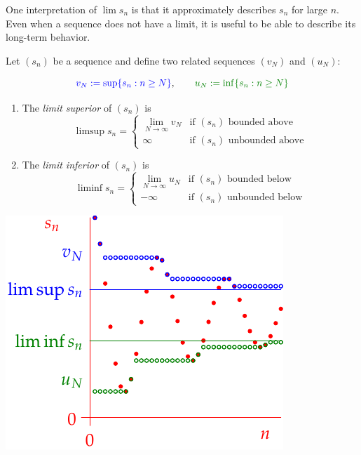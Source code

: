 \vspace{-8pt}


\goodbreak




One interpretation of $\lim s_n$ is that it approximately describes $s_n$ for large $n$. Even when a sequence does not have a limit, it is useful to be able to describe its long-term behavior.

\begin{defn}{}{}
	Let $(s_n)$ be a sequence and define two related sequences $(v_N)$ and $(u_N)$:\par
	\begin{minipage}[t]{0.6\linewidth}\vspace{-14pt}
		\[
			\textcolor{blue}{v_N:=\sup\{s_n:n\ge N\}},\qquad \textcolor{Green}{u_N:=\inf\{s_n:n\ge N\}}
		\]
		\begin{enumerate}\itemsep0pt
		  \item The \emph{limit superior} of $(s_n)$ is
		  \[
		  	\limsup s_n=
		  	\begin{cases}
		  		\lim\limits_{N\to\infty}\!v_N\!\!&\text{if $(s_n)$ bounded above}\\
		  		\infty&\text{if $(s_n)$ unbounded above}
		  	\end{cases}
		  \]
		  \item The \emph{limit inferior} of $(s_n)$ is
		  \[
		  	\liminf s_n=
		  	\begin{cases}
		  		\lim\limits_{N\to\infty}\!u_N\!\!&\text{if $(s_n)$ bounded below}\\
		  		-\infty&\text{if $(s_n)$ unbounded below}
		  	\end{cases}
		  \]
		\end{enumerate}
	\end{minipage}
	\hfill
	\begin{minipage}[t]{0.39\linewidth}\vspace{0pt}
		\hfill\includegraphics[scale=0.95]{limsup5}
	\end{minipage}
\end{defn}

